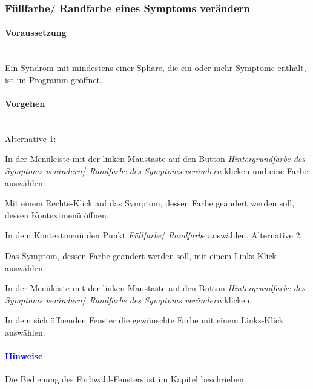 \documentclass[enabledeprecatedfontcommands,fontsize=11pt,paper=a4,twoside]{scrartcl}
\newcounter{one}
\newcounter{two}[one]
\newcommand*{\hint}{\paragraph{\textcolor{blue}{Hinweise}}}
\newcommand*{\condition}{\paragraph{Voraussetzung}$\;$ \vspace{0.2cm}\\}
\newcommand*{\actions}{\paragraph{Vorgehen} $\;$\vspace{0.2cm}\\}
\newcommand*{\aOne}{\textcolor{bbe}{Alternative 1:}}
\newcommand*{\aTwo}{\textcolor{bbe}{Alternative 2:}}
\let\tempone\itemize
\let\temptwo\enditemize
\renewenvironment{itemize}{\tempone\addtolength{\itemsep}{-10.0pt}}{\temptwo}
\let\origenumerate\enumerate
\let\origendenumerate\endenumerate
\renewenvironment{enumerate}{\origenumerate \addtolength{\itemsep}{-10.0pt}}{\origendenumerate}
\begin{document}
\subsubsection{Füllfarbe/ Randfarbe eines Symptoms verändern}
		\condition 	
		Ein Syndrom mit mindestens einer Sphäre, die ein oder mehr Symptome enthält, ist im Programm geöffnet. 
		\actions
		\aOne
		\begin{enumerate}
			\item In der Menüleiste mit der linken Maustaste auf den Button \textit{Hintergrundfarbe des Symptoms verändern}/ \textit{Randfarbe des Symptoms verändern} klicken und eine Farbe auswählen.
			\item Mit einem Rechts-Klick auf das Symptom, dessen Farbe geändert werden soll, dessen Kontextmenü öffnen.
			\item In dem Kontextmenü den Punkt \textit{Füllfarbe}/ \textit{Randfarbe} auswählen.
		\end{enumerate}		
		\aTwo
		\begin{enumerate}
			\item Das Symptom, dessen Farbe geändert werden soll, mit einem Links-Klick auswählen.
			\item In der Menüleiste mit der linken Maustaste auf den Button \textit{Hintergrundfarbe des Symptoms verändern}/ \textit{Randfarbe des Symptoms verändern} klicken.
			\item In dem sich öffnenden Fenster die gewünschte Farbe mit einem Links-Klick auswählen.
		\end{enumerate}
		
		\hint
		\begin{itemize}
			\item Die Bedienung des Farbwahl-Fensters ist im Kapitel  beschrieben. \\
		\end{itemize}		
		
\end{document}
